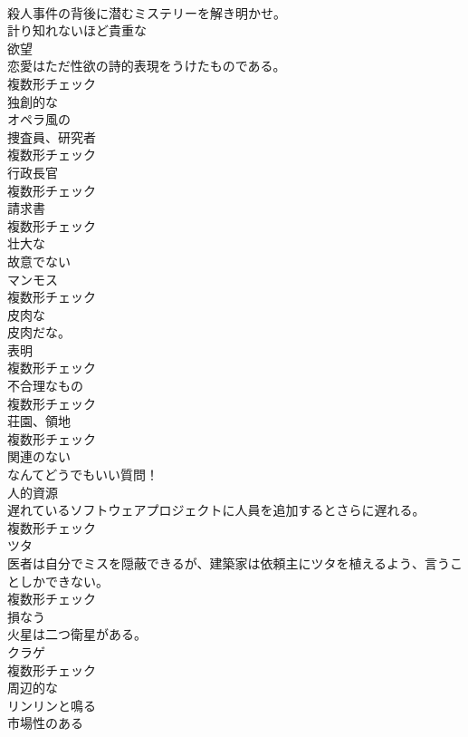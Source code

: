 \documentclass[8pt]{extreport}
\begin{document}
\begin{CJK}{UTF8}{min}
\\	殺人事件の背後に潜むミステリーを解き明かせ。	
\\	[形容詞]	計り知れないほど貴重な	
\\	[名詞]	欲望	
\\	恋愛はただ性欲の詩的表現をうけたものである。	
\\	複数形チェック
\\	[形容詞]	独創的な	
\\	[形容詞]	オペラ風の	
\\	[名詞]	捜査員、研究者	
\\	複数形チェック
\\	[名詞]	行政⻑官	
\\	複数形チェック
\\	[名詞]	請求書	
\\	複数形チェック
\\	[形容詞]	壮大な	
\\	[形容詞]	故意でない	
\\	[名詞]	マンモス	
\\	複数形チェック
\\	[形容詞]	皮肉な	
\\	皮肉だな。	
\\	[名詞]	表明	
\\	複数形チェック
\\	[名詞]	不合理なもの	
\\	複数形チェック
\\	[名詞]	荘園、領地	
\\	複数形チェック
\\	[形容詞]	関連のない	
\\	なんてどうでもいい質問！	
\\	[名詞]	人的資源	
\\	遅れているソフトウェアプロジェクトに人員を追加するとさらに遅れる。	
\\	複数形チェック
\\	[名詞]	ツタ	
\\	医者は自分でミスを隠蔽できるが、建築家は依頼主にツタを植えるよう、言うことしかできない。	
\\	複数形チェック
\\	[動詞]	損なう	
\\	火星は二つ衛星がある。	
\\	[名詞]	クラゲ	
\\	複数形チェック
\\	[形容詞]	周辺的な	
\\	[動詞]	リンリンと鳴る	
\\	[形容詞]	市場性のある	

\end{CJK}
\end{document}
